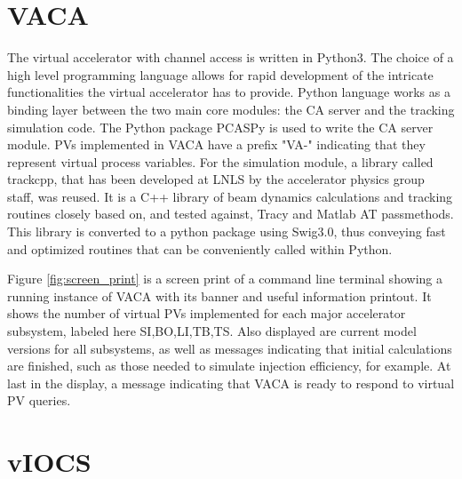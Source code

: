\documentclass[a4paper,
              ]{jacow}
\begin{document}
\section{VACA}

The virtual accelerator with channel access is written in Python3.
The choice of a high level programming language allows for rapid development of the intricate functionalities the virtual accelerator has to provide.
Python language works as a binding layer between the two main core modules: the CA server and the tracking simulation code.
The Python package PCASPy\cite{pcaspy} is used to write the CA server module.
PVs implemented in VACA have a prefix "VA-" indicating that they represent virtual process variables.
For the simulation module, a library called trackcpp\cite{trackcpp}, that has been developed at LNLS by the accelerator physics group staff, was reused.
It is a C++ library of beam dynamics calculations and tracking routines closely based on, and tested against, Tracy\cite{tracy} and Matlab AT\cite{at} passmethods.
This library is converted to a python package using Swig3.0\cite{swig}, thus conveying fast and optimized routines that can be conveniently called within Python.

Figure \ref{fig:screen_print} is a screen print of a command line terminal showing a running instance of VACA with its banner
and useful information printout.
It shows the number of virtual PVs implemented for each major accelerator subsystem, labeled here SI,BO,LI,TB,TS.
Also displayed are current model versions for all subsystems, as well as messages indicating that initial calculations are finished,
such as those needed to simulate injection efficiency, for example.
At last in the display, a message indicating that VACA is ready to respond to virtual PV queries.


\section{vIOCS}
\end{document}
